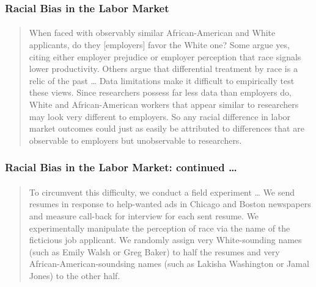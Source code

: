 \begin{frame}
  \frametitle{Racial Bias in the Labor Market}
  \framesubtitle{ \href{https://www.jstor.org/stable/3592802}{}}

  \footnotesize
  \begin{quote}
    When faced with observably similar African-American and White applicants, do they [employers] favor the White one? Some argue yes, citing either employer prejudice or employer perception that race signals lower productivity. Others argue that differential treatment by race is a relic of the past \dots 
    Data limitations make it difficult to empirically test these views. 
    \alert{Since researchers possess far less data than employers do, White and African-American workers that appear similar to researchers may look very different to employers.} 
    So any racial difference in labor market outcomes could just as easily be attributed to differences that are observable to employers but unobservable to researchers.
  \end{quote}

\end{frame}
\begin{frame}
  \frametitle{Racial Bias in the Labor Market: continued \dots}
  \framesubtitle{ \href{https://www.jstor.org/stable/3592802}{}}

  \footnotesize
  \begin{quote}
    To circumvent this difficulty, we conduct a field experiment \dots
  We send resumes in response to help-wanted ads in Chicago and Boston newspapers and measure call-back for interview for each sent resume. 
  \alert{We experimentally manipulate the perception of race via the name of the ficticious job applicant.}
    We randomly assign very White-sounding names (such as Emily Walsh or Greg Baker) to half the resumes and very African-American-soundsing names (such as Lakisha Washington or Jamal Jones) to the other half.
  \end{quote}


\end{frame}

